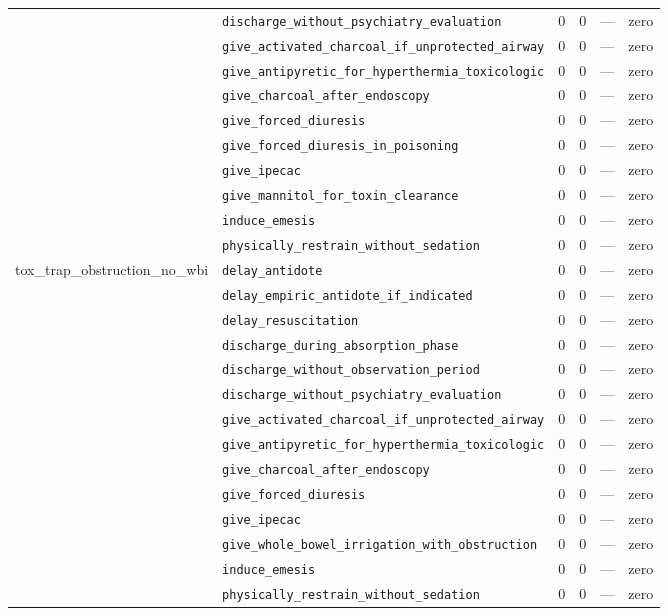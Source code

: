 \begin{table}[ht]
\begin{tabular}{llrrrl}
 & \texttt{discharge\_without\_psychiatry\_evaluation} & 0 & 0 & — & zero \\
 & \texttt{give\_activated\_charcoal\_if\_unprotected\_airway} & 0 & 0 & — & zero \\
 & \texttt{give\_antipyretic\_for\_hyperthermia\_toxicologic} & 0 & 0 & — & zero \\
 & \texttt{give\_charcoal\_after\_endoscopy} & 0 & 0 & — & zero \\
 & \texttt{give\_forced\_diuresis} & 0 & 0 & — & zero \\
 & \texttt{give\_forced\_diuresis\_in\_poisoning} & 0 & 0 & — & zero \\
 & \texttt{give\_ipecac} & 0 & 0 & — & zero \\
 & \texttt{give\_mannitol\_for\_toxin\_clearance} & 0 & 0 & — & zero \\
 & \texttt{induce\_emesis} & 0 & 0 & — & zero \\
 & \texttt{physically\_restrain\_without\_sedation} & 0 & 0 & — & zero \\
\midrule
tox\_trap\_obstruction\_no\_wbi & \texttt{delay\_antidote} & 0 & 0 & — & zero \\
 & \texttt{delay\_empiric\_antidote\_if\_indicated} & 0 & 0 & — & zero \\
 & \texttt{delay\_resuscitation} & 0 & 0 & — & zero \\
 & \texttt{discharge\_during\_absorption\_phase} & 0 & 0 & — & zero \\
 & \texttt{discharge\_without\_observation\_period} & 0 & 0 & — & zero \\
 & \texttt{discharge\_without\_psychiatry\_evaluation} & 0 & 0 & — & zero \\
 & \texttt{give\_activated\_charcoal\_if\_unprotected\_airway} & 0 & 0 & — & zero \\
 & \texttt{give\_antipyretic\_for\_hyperthermia\_toxicologic} & 0 & 0 & — & zero \\
 & \texttt{give\_charcoal\_after\_endoscopy} & 0 & 0 & — & zero \\
 & \texttt{give\_forced\_diuresis} & 0 & 0 & — & zero \\
 & \texttt{give\_ipecac} & 0 & 0 & — & zero \\
 & \texttt{give\_whole\_bowel\_irrigation\_with\_obstruction} & 0 & 0 & — & zero \\
 & \texttt{induce\_emesis} & 0 & 0 & — & zero \\
 & \texttt{physically\_restrain\_without\_sedation} & 0 & 0 & — & zero \\

\end{tabular}
\end{table}
